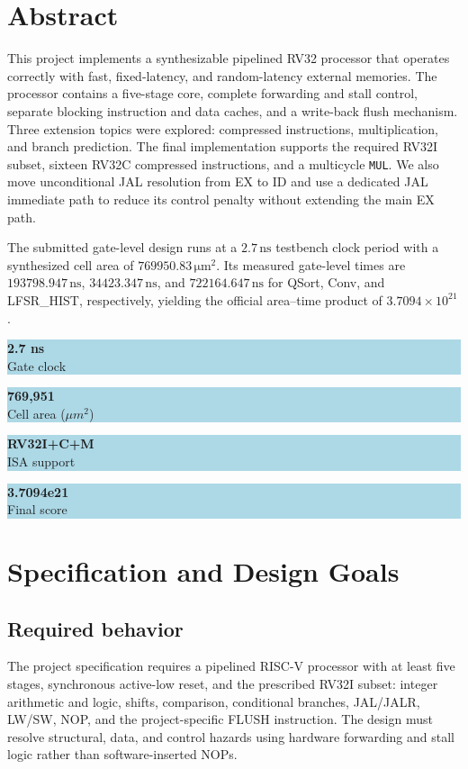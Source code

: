 \documentclass[11pt,a4paper]{article}
\providecommand{\micro}{\mu}
\newcommand{\SI}[2]{\ensuremath{#1\,\mathrm{#2}}}
\newcommand{\metric}[2]{%
  \begin{minipage}[t]{0.23\linewidth}
    \centering\colorbox{lightblue}{\parbox[c][14mm][c]{0.93\linewidth}{\centering
      {\Large\bfseries\color{navy}#1}\\[-1mm]{\small #2}}}
  \end{minipage}}
\begin{document}
\section*{Abstract}
This project implements a synthesizable pipelined RV32 processor that operates
correctly with fast, fixed-latency, and random-latency external memories.  The
processor contains a five-stage core, complete forwarding and stall control,
separate blocking instruction and data caches, and a write-back flush mechanism.
Three extension topics were explored: compressed instructions, multiplication,
and branch prediction.  The final implementation supports the required RV32I
subset, sixteen RV32C compressed instructions, and a multicycle \texttt{MUL}.
We also move unconditional JAL resolution from EX to ID and use a dedicated JAL
immediate path to reduce its control penalty without extending the main EX path.

The submitted gate-level design runs at a \SI{2.7}{ns} testbench clock period
with a synthesized cell area of \SI{769950.83}{\micro m^2}.  Its measured
gate-level times are \SI{193798.947}{ns}, \SI{34423.347}{ns}, and
\SI{722164.647}{ns} for QSort, Conv, and LFSR\_HIST, respectively, yielding the
official area--time product of \(3.7094\times10^{21}\).

\vspace{4mm}
\noindent
\metric{2.7 ns}{Gate clock}\hfill
\metric{769,951}{Cell area (\(\mu m^2\))}\hfill
\metric{RV32I+C+M}{ISA support}\hfill
\metric{3.7094e21}{Final score}

\setcounter{tocdepth}{1}
\tableofcontents
\clearpage
{}

\section{Specification and Design Goals}

\subsection{Required behavior}
The project specification requires a pipelined RISC-V processor with at least
five stages, synchronous active-low reset, and the prescribed RV32I subset:
integer arithmetic and logic, shifts, comparison, conditional branches,
JAL/JALR, LW/SW, NOP, and the project-specific FLUSH instruction.  The design
must resolve structural, data, and control hazards using hardware forwarding
and stall logic rather than software-inserted NOPs.
\end{document}
